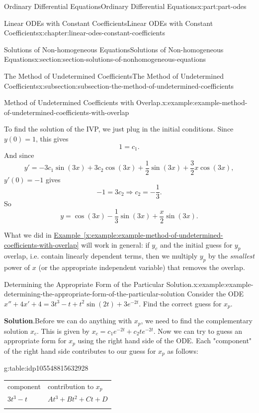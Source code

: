 \documentclass[twoside,10pt,]{book}
\newcommand{\blocktitlefont}{\relax}
\newcommand{\tabularfont}{\relax}
\newcommand{\xreffont}{\relax}
\numberwithin{equation}{part}
\newcommand{\hrulethick} {\noalign{\hrule height 0.11em}}
\begin{document}
\begin{partptx}{Ordinary Differential Equations}{}{Ordinary Differential Equations}{}{}{x:part:part-odes}
\begin{chapterptx}{Linear ODEs with Constant Coefficients}{}{Linear ODEs with Constant Coefficients}{}{}{x:chapter:linear-odes-constant-coefficients}
\begin{sectionptx}{Solutions of Non-homogeneous Equations}{}{Solutions of Non-homogeneous Equations}{}{}{x:section:section-solutions-of-nonhomogeneous-equations}
\begin{subsectionptx}{The Method of Undetermined Coefficients}{}{The Method of Undetermined Coefficients}{}{}{x:subsection:subsection-the-method-of-undetermined-coefficients}
\begin{example}{Method of Undetermined Coefficients with Overlap.}{x:example:example-method-of-undetermined-coefficients-with-overlap}
%
\par
To find the solution of the IVP, we just plug in the initial conditions. Since \(y(0) = 1\), this gives%
\begin{equation*}
1 = c_{1}.
\end{equation*}
And since%
\begin{equation*}
y' = -3c_{1}\sin(3x)+3c_{2}\cos(3x) + \frac{1}{2}\sin(3x)+\frac{3}{2}x\cos(3x),
\end{equation*}
\(y'(0)=-1\) gives%
\begin{equation*}
-1 = 3c_{2}\Rightarrow c_{2} = -\frac{1}{3}.
\end{equation*}
So%
\begin{equation*}
y = \cos(3x)-\frac{1}{3}\sin(3x)+\frac{x}{2}\sin(3x).
\end{equation*}
%
\end{example}
What we did in \hyperref[x:example:example-method-of-undetermined-coefficients-with-overlap]{Example~{\xreffont\ref{x:example:example-method-of-undetermined-coefficients-with-overlap}}} will work in general: if \(y_{c}\) and the initial guess for \(y_{p}\) overlap, i.e. contain linearly dependent terms, then we multiply \(y_{p}\) by the \emph{smallest} power of \(x\) (or the appropriate independent variable) that removes the overlap.%
\begin{example}{Determining the Appropriate Form of the Particular Solution.}{x:example:example-determining-the-appropriate-form-of-the-particular-solution}%
Consider the ODE \(x'' + 4x' + 4 = 3t^{3} - t + t^{2}\sin(2t) + 3e^{-2t}.\) Find the correct guess for \(x_{p}\).%
\par\smallskip%
\noindent\textbf{\blocktitlefont Solution}.\hypertarget{g:solution:idp105548815630496}{}\quad{}Before we can do anything with \(x_{p}\), we need to find the complementary solution \(x_{c}\). This is given by \(x_{c} = c_{1}e^{-2t} + c_{2}te^{-2t}.\) Now we can try to guess an appropriate form for \(x_{p}\) using the right hand side of the ODE. Each "component" of the right hand side contributes to our guess for \(x_{p}\) as follows: \begin{tableptx}{\textbf{}}{g:table:idp105548815632928}{}%
\centering%
{\tabularfont%
\begin{tabular}{ll}\hrulethick
component&contribution to \(x_{p}\)\tabularnewline\hrulethick
\(3t^{3} - t\)&\(At^{3} + Bt^{2} + Ct + D\)\tabularnewline\hrulethick

\end{tabular}}
\end{tableptx}
\end{example}
\end{subsectionptx}
\end{sectionptx}
\end{chapterptx}
\end{partptx}
\end{document}
